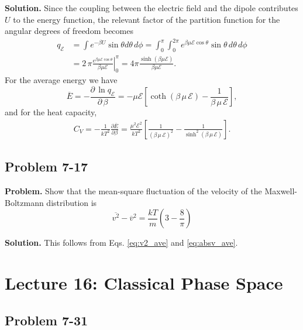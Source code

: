 \documentclass[twocolumn, 10pt]{article}
\numberwithin{equation}{section}
\newenvironment{problem}
{\par\medskip\sffamily \color{problue}
  \textbf{Problem. }\ignorespaces}
{\medskip}
\newenvironment{solution}
{\par\medskip
  \textbf{Solution. }\ignorespaces}
{\medskip}
\begin{document}
\begin{solution}
Since the coupling between the electric field
and the dipole contributes $U$
to the energy function,
the relevant factor of the partition function
for the angular degrees of freedom becomes
\begin{align*}
  q_{\mathscr E}
  &=
  \int e^{-\beta U} \sin\theta d\theta \, d\phi
  =
  \int_0^\pi \int_0^{2\pi}
  e^{\beta \mu \mathscr E \cos\theta}
  \sin\theta \, d\theta \, d\phi
  \\
  &=
  2 \, \pi \left. \frac{
    e^{\beta \mu \mathscr E \cos\theta }
  } { \beta \mu \mathscr E}
  \right|_{0}^\pi
  =
  4 \pi \frac{ \sinh(\beta\mu\mathscr E) }
  {\beta \mu \mathscr E}
  .
\end{align*}
For the average energy we have
$$
  \overline E
  =
  - \frac{ \partial \, \ln q_{\mathscr E} }
         { \partial \, \beta }
  =
  -\mu \mathscr E
  \left[
    \coth(\beta \, \mu \, \mathscr E)
    -
    \frac{1}{\beta \, \mu \, \mathscr E}
  \right]
  ,
$$
and for the heat capacity,
  \begin{align*}
  C_V
  =-\frac{ 1 } { k T^2 }
    \frac{ \partial \overline E }
    {\partial \beta }
  =
  \frac{ \mu^2 \mathscr E^2 } { kT^2 }
  \left[
    \frac{1}{(\beta \, \mu \, \mathscr E)^2}
    -
    \frac{1}{\sinh^2(\beta \, \mu \, \mathscr E)}
  \right].
  \end{align*}
\end{solution}


\subsection{Problem 7-17}

\begin{problem}
  Show that the mean-square fluctuation of
  the velocity of the Maxwell-Boltzmann distribution
  is
  $$
  \overline{ v^2 } - \overline{v}^2
  =
  \frac{ k T } { m }
  \left(3 - \frac{8}{\pi} \right)
  $$
\end{problem}

\begin{solution}
  This follows from Eqs.
  \eqref{eq:v2_ave} and \eqref{eq:absv_ave}.
\end{solution}

\section{Lecture 16: Classical Phase Space}

\subsection{Problem 7-31}
\end{document}

